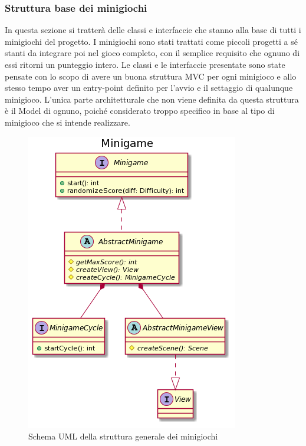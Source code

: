 \documentclass[a4paper,12pt]{report}
\begin{document}
	\subsubsection{Struttura base dei minigiochi}
	In questa sezione si tratterà delle classi e interfaccie che stanno alla base di tutti i minigiochi del progetto.\newline
	\newline
	I minigiochi sono stati trattati come piccoli progetti a sé stanti da integrare poi nel gioco completo, con il semplice requisito che ognuno di essi ritorni un punteggio intero.\newline
	Le classi e le interfaccie presentate sono state pensate con lo scopo di avere un buona struttura MVC per ogni minigioco e allo stesso tempo aver un entry-point definito per l'avvio e il settaggio di qualunque minigioco. L'unica parte architetturale che non viene definita da questa struttura è il Model di ognuno, poiché considerato troppo specifico in base al tipo di minigioco che si intende realizzare.\newline
    \begin{figure}[!t]
        \centering{}
        \includegraphics{images/picchiotti/minigame.png}
        \caption{Schema UML della struttura generale dei minigiochi}
        \label{img:minigame}
    \end{figure}
\end{document}

